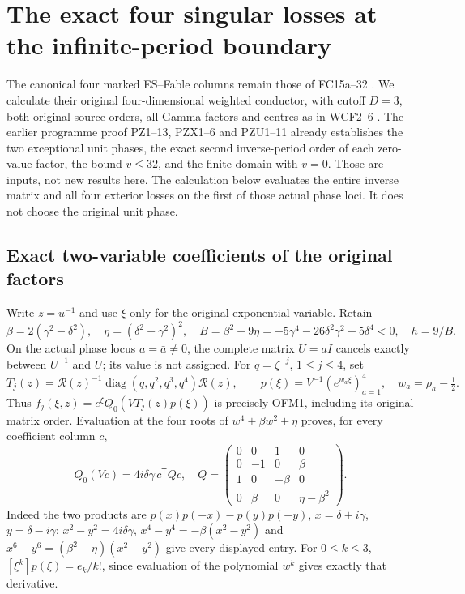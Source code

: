 \documentclass[11pt]{article}
\begin{document}
\section{The exact four singular losses at the infinite-period boundary}
The canonical four marked ES--Fable columns remain those of
FC15a--32 \cite{ES488}. We calculate their original four-dimensional
weighted conductor, with cutoff $D=3$, both original source orders,
all Gamma factors and centres as in WCF2--6 \cite{WCF,DLMF18Source}.
The earlier programme proof PZ1--13, PZX1--6 and PZU1--11
\cite{PeriodZeroOriginal} already establishes the two exceptional
unit phases, the exact second inverse-period order of each zero-value
factor, the bound $v\le32$, and the finite domain with $v=0$.
Those are inputs, not new results here. The calculation below evaluates
the entire inverse matrix and all four exterior losses on the first
of those actual phase loci. It does not choose the original unit phase.

\subsection{Exact two-variable coefficients of the original factors}
Write $z=u^{-1}$ and use $\xi$ only for the original exponential
variable. Retain
\[
 \beta=2(\gamma^2-\delta^2),\quad
 \eta=(\delta^2+\gamma^2)^2,\quad
 B=\beta^2-9\eta=-5\gamma^4-26\delta^2\gamma^2-5\delta^4<0,
 \quad h=9/B.
 \tag{PIN1}
\]
On the actual phase locus $a=\bar a\ne0$, the complete matrix
$U=aI$ cancels exactly between $U^{-1}$ and $U$; its value is not
assigned. For $q=\zeta^{-j}$, $1\le j\le4$, set
\[
 T_j(z)=\mathcal R(z)^{-1}
       \operatorname{diag}(q,q^2,q^3,q^4)\mathcal R(z),\qquad
 p(\xi)=V^{-1}(e^{w_a\xi})_{a=1}^4,\quad w_a=\rho_a-\tfrac12.
 \tag{PIN2}
\]
Thus $f_j(\xi,z)=e^\xi Q_0(VT_j(z)p(\xi))$ is precisely OFM1,
including its original matrix order. Evaluation at the four roots of
$w^4+\beta w^2+\eta$ proves, for every coefficient column $c$,
\[
 Q_0(Vc)=4i\delta\gamma\,c^{\mathsf T}Qc,\quad
 Q=\begin{pmatrix}0&0&1&0\\0&-1&0&\beta\\
 1&0&-\beta&0\\0&\beta&0&\eta-\beta^2\end{pmatrix}.
 \tag{PIN3}
\]
Indeed the two products are $p(x)p(-x)-p(y)p(-y)$,
$x=\delta+i\gamma$, $y=\delta-i\gamma$;
$x^2-y^2=4i\delta\gamma$,
$x^4-y^4=-\beta(x^2-y^2)$ and
$x^6-y^6=(\beta^2-\eta)(x^2-y^2)$ give every displayed entry.
For $0\le k\le3$, $[\xi^k]p(\xi)=e_k/k!$, since evaluation
of the polynomial $w^k$ gives exactly that derivative.
\end{document}
